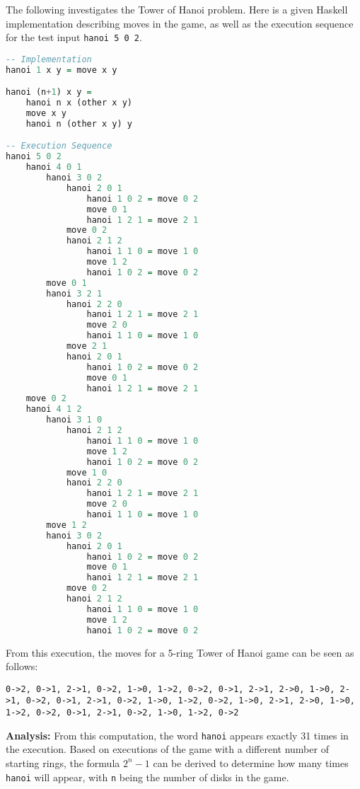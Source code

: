 \documentclass{article}
\theoremstyle{theorem}
\theoremstyle{definition}
\theoremstyle{remark}
\begin{document}
The following investigates the Tower of Hanoi problem. Here is a given Haskell implementation describing moves in the game, as well as the execution sequence for the test input \texttt{hanoi 5 0 2}.
\begin{lstlisting}[language=Haskell]
-- Implementation
hanoi 1 x y = move x y

hanoi (n+1) x y = 
    hanoi n x (other x y) 
    move x y 
    hanoi n (other x y) y

-- Execution Sequence
hanoi 5 0 2
    hanoi 4 0 1
        hanoi 3 0 2
            hanoi 2 0 1
                hanoi 1 0 2 = move 0 2
                move 0 1
                hanoi 1 2 1 = move 2 1
            move 0 2
            hanoi 2 1 2
                hanoi 1 1 0 = move 1 0
                move 1 2
                hanoi 1 0 2 = move 0 2
        move 0 1
        hanoi 3 2 1
            hanoi 2 2 0
                hanoi 1 2 1 = move 2 1
                move 2 0
                hanoi 1 1 0 = move 1 0
            move 2 1
            hanoi 2 0 1
                hanoi 1 0 2 = move 0 2
                move 0 1
                hanoi 1 2 1 = move 2 1
    move 0 2
    hanoi 4 1 2
        hanoi 3 1 0
            hanoi 2 1 2
                hanoi 1 1 0 = move 1 0
                move 1 2
                hanoi 1 0 2 = move 0 2
            move 1 0
            hanoi 2 2 0
                hanoi 1 2 1 = move 2 1
                move 2 0
                hanoi 1 1 0 = move 1 0
        move 1 2
        hanoi 3 0 2
            hanoi 2 0 1
                hanoi 1 0 2 = move 0 2
                move 0 1
                hanoi 1 2 1 = move 2 1
            move 0 2
            hanoi 2 1 2
                hanoi 1 1 0 = move 1 0
                move 1 2
                hanoi 1 0 2 = move 0 2
\end{lstlisting} 
From this execution, the moves for a 5-ring Tower of Hanoi game can be seen as follows:
\begin{lstlisting}
0->2, 0->1, 2->1, 0->2, 1->0, 1->2, 0->2, 0->1, 2->1, 2->0, 1->0, 2->1, 0->2, 0->1, 2->1, 0->2, 1->0, 1->2, 0->2, 1->0, 2->1, 2->0, 1->0, 1->2, 0->2, 0->1, 2->1, 0->2, 1->0, 1->2, 0->2
\end{lstlisting}

\noindent \textbf{Analysis:} From this computation, the word \texttt{hanoi} appears exactly 31 times in the execution. Based on executions of the game with a different number of starting rings, the formula $2^n - 1$ can be derived to determine how many times \texttt{hanoi} will appear, with \texttt{n} being the number of disks in the game.
\end{document}
